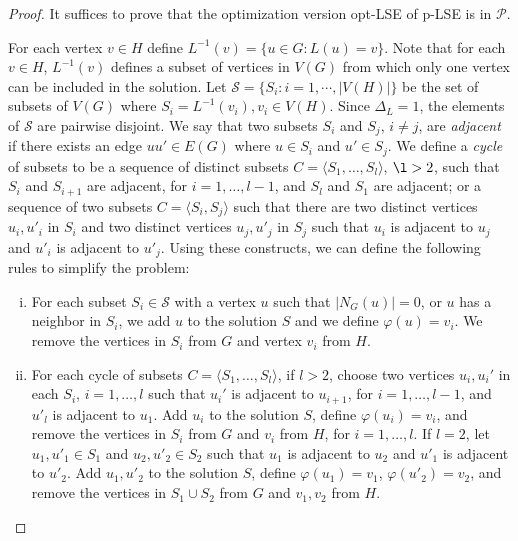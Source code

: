 \documentclass[11pt]{article}
\newcommand{\Pol}{\mbox{$\mathcal P$}}
\let\phi=\varphi
\begin{document}
\begin{proof}
It suffices to prove that the optimization version opt-LSE of p-LSE is in $\Pol$.

For each vertex $v \in H$ define $L^{-1}(v) = \{u \in G : L(u) = v\}$. Note that for each $v \in H$, $L^{-1}(v)$ defines a subset of vertices in $V(G)$ from which only one vertex can be included in the solution.  Let $\mathcal{S} = \{S_i : i = 1,\cdots,|V(H)|\}$ be the set of subsets of $V(G)$ where $S_i = L^{-1}(v_i), v_i \in V(H)$. Since $\Delta_L=1$, the elements of $\mathcal{S}$ are pairwise disjoint. We say that two subsets $S_i$ and $S_j$, $i \neq j$, are {\em adjacent} if there exists an edge $uu' \in E(G)$ where $u \in S_i$ and $u' \in S_j$.  We define a {\em cycle} of subsets to be a sequence of distinct subsets $C = \langle S_1, \ldots, S_l \rangle$, $\l > 2$, such that $S_i$ and $S_{i+1}$ are adjacent, for $i=1, \ldots, l-1$, and $S_l$ and $S_1$ are adjacent; or a sequence of two subsets $C = \langle S_i, S_j \rangle$ such that there are two distinct vertices $u_i, u'_i$ in $S_i$ and two distinct vertices $u_j, u'_j$ in $S_j$ such that $u_i$ is adjacent to $u_j$ and $u'_i$ is adjacent to $u'_j$.  Using these constructs, we can define the following rules to simplify the problem:

\begin{enumerate}[(i)]
  \item For each subset $S_i \in \mathcal{S}$ with a vertex $u$ such that $|N_{G}(u)| = 0$, or $u$ has a neighbor in $S_i$, we add $u$ to the solution $S$ and we define $\phi(u) = v_i$. We remove the vertices in $S_i$ from $G$ and vertex $v_i$ from $H$.

  \item For each cycle of subsets $C = \langle S_1, \ldots, S_l \rangle$, if $l > 2$, choose two vertices $u_i, u_i'$ in each $S_i$, $i=1, \ldots, l$ such that $u_i'$ is adjacent to $u_{i+1}$, for $i=1, \ldots, l-1$, and $u'_l$ is adjacent to $u_1$. Add $u_i$ to the solution $S$, define $\phi(u_i)=v_i$, and remove the vertices in $S_i$ from $G$ and $v_i$ from $H$, for $i=1, \ldots, l$. If $l=2$, let $u_1, u'_1 \in S_1$ and $u_2, u'_2 \in S_2$ such that $u_1$ is adjacent to $u_2$ and $u'_1$ is adjacent to $u'_2$. Add $u_1, u'_2$ to the solution $S$, define $\phi(u_1)=v_1$, $\phi(u'_2)=v_2$, and remove the vertices in $S_1 \cup S_2$ from $G$ and $v_1, v_2$ from $H$.
\end{enumerate}


\end{proof}
\end{document}
